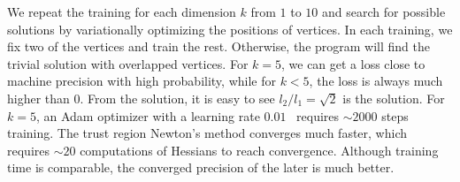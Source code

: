 \documentclass{article}
\newcommand{\<}{\langle}
\renewcommand{\>}{\rangle}
\theoremstyle{definition}\newtheorem{definition}{\textit{Definition}}
\begin{document}
We repeat the training for each dimension $k$ from $1$ to $10$ and search for possible solutions by variationally optimizing the positions of vertices.
In each training, we fix two of the vertices and train the rest. Otherwise, the program will find the trivial solution with overlapped vertices. 
For $k=5$, we can get a loss close to machine precision with high probability, while for $k < 5$, the loss is always much higher than $0$.
From the solution, it is easy to see $l_2/l_1 = \sqrt{2}$ is the solution.
For $k=5$, an Adam optimizer with a learning rate $0.01$~\cite{Kingma2014} requires $\sim2000$ steps training.
The trust region Newton's method converges much faster, which requires $\sim 20$ computations of Hessians to reach convergence.
Although training time is comparable, the converged precision of the later is much better.
\end{document}
